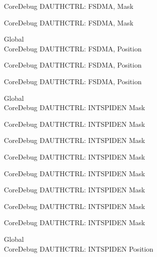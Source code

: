 \begin{DoxyRefList}
\label{deprecated__deprecated000535}%
%
Core\+Debug DAUTHCTRL\+: FSDMA, Mask 

\label{deprecated__deprecated000637}%
%
Core\+Debug DAUTHCTRL\+: FSDMA, Mask  
\item[Global \doxylink{group___c_m_s_i_s___s_c_b_ga2b4fde73cbbbb0adeb686dc20ff705de}{Core\+Debug\+\_\+\+DAUTHCTRL\+\_\+\+FSDMA\+\_\+\+Pos} ]\hfill \\
\label{deprecated__deprecated000083}%
%
Core\+Debug DAUTHCTRL\+: FSDMA, Position 

\label{deprecated__deprecated000534}%
%
Core\+Debug DAUTHCTRL\+: FSDMA, Position 

\label{deprecated__deprecated000636}%
%
Core\+Debug DAUTHCTRL\+: FSDMA, Position  
\item[Global \doxylink{group___c_m_s_i_s___s_c_b_ga1570f149a0f89f70fc2644a5842cbcb4}{Core\+Debug\+\_\+\+DAUTHCTRL\+\_\+\+INTSPIDEN\+\_\+\+Msk} ]\hfill \\
\label{deprecated__deprecated000090}%
%
Core\+Debug DAUTHCTRL\+: INTSPIDEN Mask 

\label{deprecated__deprecated000144}%
%
Core\+Debug DAUTHCTRL\+: INTSPIDEN Mask 

\label{deprecated__deprecated000220}%
%
Core\+Debug DAUTHCTRL\+: INTSPIDEN Mask 

\label{deprecated__deprecated000283}%
%
Core\+Debug DAUTHCTRL\+: INTSPIDEN Mask 

\label{deprecated__deprecated000362}%
%
Core\+Debug DAUTHCTRL\+: INTSPIDEN Mask 

\label{deprecated__deprecated000438}%
%
Core\+Debug DAUTHCTRL\+: INTSPIDEN Mask 

\label{deprecated__deprecated000541}%
%
Core\+Debug DAUTHCTRL\+: INTSPIDEN Mask 

\label{deprecated__deprecated000643}%
%
Core\+Debug DAUTHCTRL\+: INTSPIDEN Mask  
\item[Global \doxylink{group___c_m_s_i_s___s_c_b_ga3caef9790e4e2ccbfea77d55315ad59f}{Core\+Debug\+\_\+\+DAUTHCTRL\+\_\+\+INTSPIDEN\+\_\+\+Pos} ]\hfill \\
\label{deprecated__deprecated000089}%
%
Core\+Debug DAUTHCTRL\+: INTSPIDEN Position 


\end{DoxyRefList}
